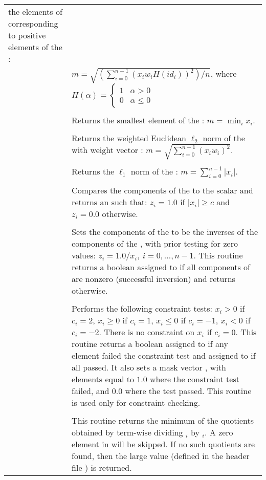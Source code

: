 \begin{xtabular}{|p{\colone}|p{\coltwo}|}
the elements of  corresponding to
positive elements of the  :\\
&$m = \sqrt{\left( \sum_{i=0}^{n-1} (x_i w_i H(id_i))^2 \right) / n}$,
where
$
H(\alpha) =
\begin{cases}
1 & \alpha > 0 \\
0 & \alpha \leq 0
\end{cases}
$
\\[2mm]
 &  \\
& Returns the smallest element of the  :
$m = \min_i x_i $.
\\[2mm]
 &  \\
& Returns the weighted Euclidean $\ell_2$ norm of the  
with  weight vector :
$m = \sqrt{\sum_{i=0}^{n-1} (x_i w_i)^2}$.
\\[2mm]
 &  \\
& Returns the $\ell_1$ norm of the  :
$m = \sum_{i=0}^{n-1} | x_i |$.
\\[2mm]
 &  \\
& Compares the components of the   to the 
scalar  and returns an   such that:
$z_i = 1.0$ if $| x_i | \ge c$ and $z_i = 0.0$ otherwise.
\\[2mm]
 &  \\
& Sets the components of the   to be the inverses
of the components of the  , with prior testing
for zero values:
$z_i = 1.0 /  x_i  , \: i=0,\ldots,n-1$.
This routine returns a boolean assigned to  if all
components of  are
nonzero (successful inversion) and returns  otherwise.
\\[2mm]
 &  \\
& Performs the following constraint tests:
$x_i > 0$ if $c_i=2$,
$x_i \ge 0$ if $c_i=1$,
$x_i \le 0$ if $c_i=-1$,
$x_i < 0$ if $c_i=-2$.
There is no constraint on $x_i$ if $c_i=0$.
This routine returns a boolean assigned to  if any element failed
the constraint test and assigned to  if all passed.  It also sets a
mask vector , with elements equal to $1.0$ where the constraint
test failed, and $0.0$ where the test passed.
This routine is used only for constraint checking.
\\[2mm]
 &  \\
& This routine returns the minimum of the quotients obtained
by term-wise dividing $_i$ by $_i$.
A zero element in  will be skipped.
If no such quotients are found, then the large value
 (defined in the header file )
is returned.
\\
\end{xtabular}
\bigskip

